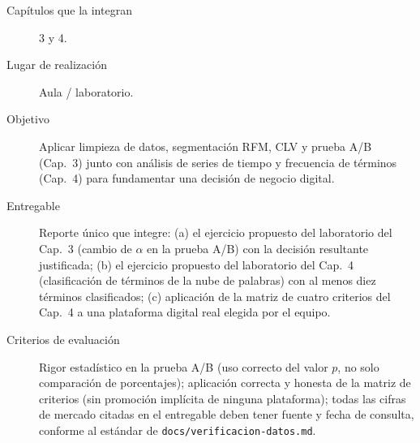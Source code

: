 \begin{description}
  \item[Capítulos que la integran] 3 y 4.
  \item[Lugar de realización] Aula / laboratorio.
  \item[Objetivo] Aplicar limpieza de datos, segmentación RFM, CLV y prueba
  A/B (Cap.~3) junto con análisis de series de tiempo y frecuencia de
  términos (Cap.~4) para fundamentar una decisión de negocio digital.
  \item[Entregable] Reporte único que integre: (a) el ejercicio propuesto del
  laboratorio del Cap.~3 (cambio de $\alpha$ en la prueba A/B) con la
  decisión resultante justificada; (b) el ejercicio propuesto del
  laboratorio del Cap.~4 (clasificación de términos de la nube de palabras)
  con al menos diez términos clasificados; (c) aplicación de la matriz de
  cuatro criterios del Cap.~4 a una plataforma digital real elegida por el
  equipo.
  \item[Criterios de evaluación] Rigor estadístico en la prueba A/B (uso
  correcto del valor $p$, no solo comparación de porcentajes); aplicación
  correcta y honesta de la matriz de criterios (sin promoción implícita de
  ninguna plataforma); todas las cifras de mercado citadas en el entregable
  deben tener fuente y fecha de consulta, conforme al estándar de
  \texttt{docs/verificacion-datos.md}.
\end{description}
